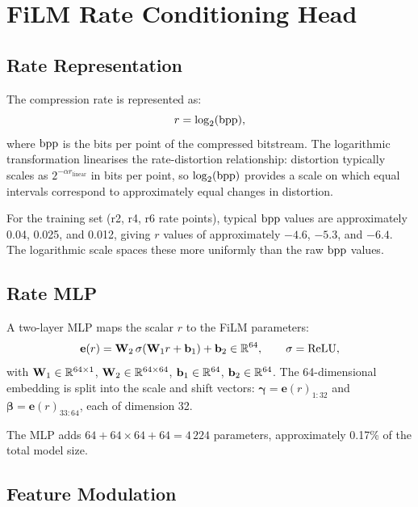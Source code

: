\section{FiLM Rate Conditioning Head}
\label{sec:film-head}

\subsection{Rate Representation}

The compression rate is represented as:
\begin{equation}
  r = \log_2(\mathrm{bpp}),
\end{equation}
where $\mathrm{bpp}$ is the bits per point of the compressed bitstream.
The logarithmic transformation linearises the rate-distortion relationship:
distortion typically scales as $2^{-\alpha r_{\text{linear}}}$ in bits per point,
so $\log_2(\mathrm{bpp})$ provides a scale on which equal intervals correspond to
approximately equal changes in distortion.

For the training set (r2, r4, r6 rate points), typical $\mathrm{bpp}$ values are
approximately 0.04, 0.025, and 0.012, giving $r$ values of approximately
$-4.6$, $-5.3$, and $-6.4$.
The logarithmic scale spaces these more uniformly than the raw $\mathrm{bpp}$ values.

\subsection{Rate MLP}

A two-layer MLP maps the scalar $r$ to the FiLM parameters:
\begin{equation}
  \mathbf{e}(r) = \mathbf{W}_2\,\sigma(\mathbf{W}_1 r + \mathbf{b}_1) + \mathbf{b}_2
  \in \mathbb{R}^{64}, \qquad \sigma = \text{ReLU},
\end{equation}
with $\mathbf{W}_1 \in \mathbb{R}^{64 \times 1}$, $\mathbf{W}_2 \in \mathbb{R}^{64 \times 64}$,
$\mathbf{b}_1 \in \mathbb{R}^{64}$, $\mathbf{b}_2 \in \mathbb{R}^{64}$.
The 64-dimensional embedding is split into the scale and shift vectors:
$\boldsymbol{\gamma} = \mathbf{e}(r)_{1:32}$ and
$\boldsymbol{\beta} = \mathbf{e}(r)_{33:64}$, each of dimension 32.

The MLP adds $64 + 64 \times 64 + 64 = 4\,224$ parameters,
approximately 0.17\% of the total model size.

\subsection{Feature Modulation}


